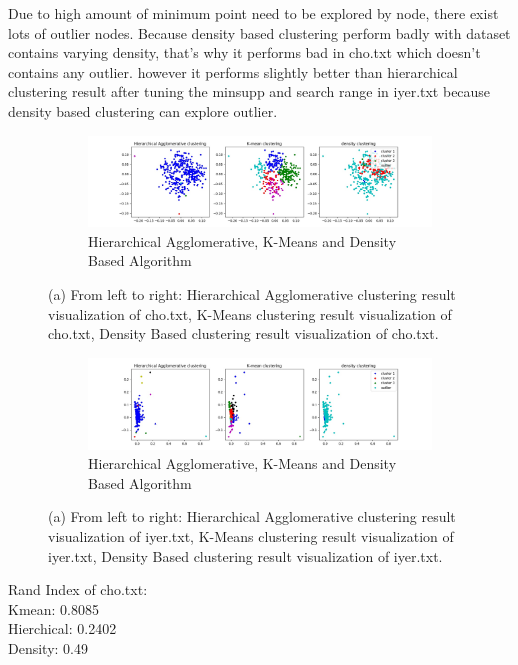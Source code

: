 \documentclass[fleqn]{llncs}
\begin{document}
Due to high amount of minimum point need to be explored by node, there exist lots of outlier nodes. Because density based clustering perform badly with dataset contains varying density, that's why it performs bad in cho.txt which doesn't contains any outlier. however it performs slightly better than hierarchical clustering result after tuning the minsupp and search range in iyer.txt because density based clustering can explore outlier.

\begin{figure}
	\centering
	\begin{subfigure}{1\textwidth}
		\centering\includegraphics[width=1\textwidth]{all_threecho.jpg}
		\caption{Hierarchical Agglomerative, K-Means and Density Based Algorithm}
	\end{subfigure}
	\caption{(a) From left to right: Hierarchical Agglomerative clustering result visualization of cho.txt, K-Means clustering result visualization of cho.txt, Density Based clustering result visualization of cho.txt.}
	\label{fig2}
\end{figure}
\begin{figure}
	\centering
	\begin{subfigure}{1\textwidth}
		\centering\includegraphics[width=1\textwidth]{all_threeiyer.jpg}
		\caption{Hierarchical Agglomerative, K-Means and Density Based Algorithm}
	\end{subfigure}
	\caption{(a) From left to right: Hierarchical Agglomerative clustering result visualization of iyer.txt, K-Means clustering result visualization of iyer.txt, Density Based clustering result visualization of iyer.txt.}
	\label{fig3}
\end{figure}
Rand Index of cho.txt:\\
Kmean: 0.8085\\ 
Hierchical: 0.2402\\
Density: 0.49\\
\end{document}
